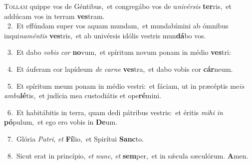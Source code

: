 \lettrine{\initial\textcolor{\initialcolor}{T}}{ollam} quippe vos de Géntibus,~\dagger et congregábo vos de u\-\textit{ni}\-\textit{vér}\textit{sis} \textbf{ter}\-ris,~\star et addúcam vos in terram \textbf{ves}\-tram.\\
{\numbfont\textcolor{\numbcolor}{~2.}}~Et effúndam super vos aquam mundam,~\dagger et mundabímini ab ómnibus inqui\-\textit{na}\-\textit{mén}\textit{tis} \textbf{ves}\-tris,~\star et ab univérsis idólis vestris mun\-\textbf{dá}\-bo vos.\par
{\numbfont\textcolor{\numbcolor}{~3.}}~Et dabo \textit{vo}\-\textit{bis} \textit{cor} \textbf{no}\-vum,~\star et spíritum novum ponam in médio \textbf{ves}\-tri:\par
{\numbfont\textcolor{\numbcolor}{~4.}}~Et áuferam cor lapídeum \textit{de} \textit{car}\-\textit{ne} \textbf{ves}\-tra,~\star et dabo vobis cor \textbf{cár}\-neum.\par
{\numbfont\textcolor{\numbcolor}{~5.}}~Et spíritum meum ponam in médio vestri:~\dagger et fáciam, ut in præcéptis me\textit{is} \textit{am}\-\textit{bu}\textbf{lé}tis,~\star et judícia mea custodiátis et ope\-\textbf{ré}\-mini.\par
{\numbfont\textcolor{\numbcolor}{~6.}}~Et habitábitis in terra, quam dedi pátribus vestris:~\dagger et éritis \textit{mi}\-\textit{hi} \textit{in} \textbf{pó}\-pulum,~\star et ego ero vobis in \textbf{De}\-um.\par
{\numbfont\textcolor{\numbcolor}{~7.}}~Glória \textit{Pa}\-\textit{tri}, \textit{et} \textbf{Fí}\-lio,~\star et Spirítui \textbf{Sanc}\-to.\par
{\numbfont\textcolor{\numbcolor}{~8.}}~Sicut erat in princípio, \textit{et} \textit{nunc}\-, \textit{et} \textbf{sem}\-per,~\star et in sǽcula sæculórum. \textbf{A}\-men.\par
